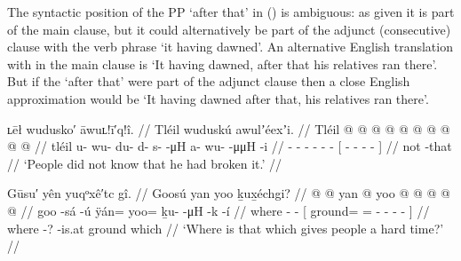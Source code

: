 The syntactic position of the PP  ‘after that’ in (\lastx) is ambiguous: as given it is part of the main clause, but it could alternatively be part of the adjunct (consecutive) clause with the verb phrase  ‘it having dawned’.
An alternative English translation with  in the main clause is ‘It having dawned, after that his relatives ran there’.
But if the  ‘after that’ were part of the adjunct clause then a close English approximation would be ‘It having dawned after that, his relatives ran there’.

\ex\label{ex:93-41-didnt-know-broke}%
%
\begingl
	\glpreamble	ʟēł wudusko′ āwuʟ!ī′q!î. //
	\glpreamble	Tléil wuduskú awulʼéexʼi. //
	\gla	Tléil  @ {} @ {} @ {} @ {} @ {} @ {}
		{}  @ {} @ {} @ {} @ {} {} //
	\glb	tléil u- wu- du- d- s-  -μH
		{} a- wu-  -μμH -i {} //
	\glc	{} - - - - -  -
		{}[ - -  - - {}] //
	\gld	not  {} {} {} {} {} {}
		{}  {} {} {} -that {} //
	\glft	‘People did not know that he had broken it.’
		//
\endgl
\xe

\ex\label{ex:93-42-where-is-hard-time}%
%
\begingl
	\glpreamble	Gūsu′ yên yuqᵒxê′tc gî. //
	\glpreamble	Goosú yan yoo ḵux̱échgi? //
	\gla	{} @ {} @ {} 
		{} yan @ yoo @  @ {} @ {} @ {} @ {} {} //
	\glb	goo -sá -ú 
		{} ÿán= yoo= ḵu-  -μH -k -í {} //
	\glc	where - -
		{}[ ground= = -  - - - {}] //
	\gld	where -? -is.at
		{} ground   {} {} {} \·which {} //
	\glft	‘Where is that which gives people a hard time?’
		//
\endgl
\xe

